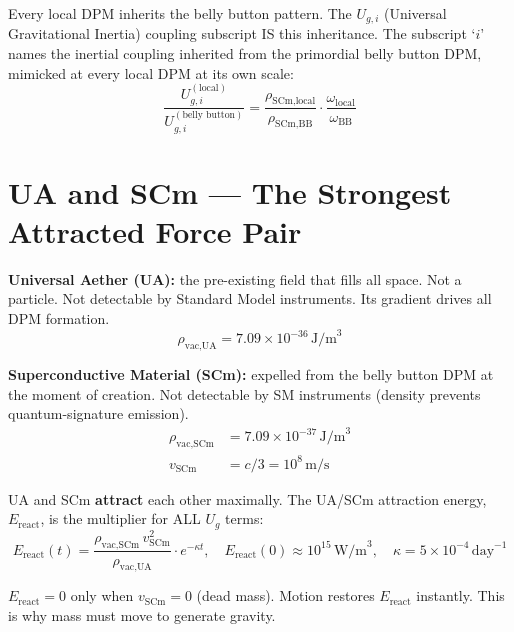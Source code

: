 \documentclass[12pt,a4paper]{article}
\begin{document}
Every local DPM inherits the belly button pattern.  The $U_{g,i}$
(Universal Gravitational Inertia) coupling subscript IS this inheritance.
The subscript `$i$' names the inertial coupling inherited from the primordial belly
button DPM, mimicked at every local DPM at its own scale:
\begin{equation}
  \frac{U_{g,i}^{(\text{local})}}{U_{g,i}^{(\text{belly button})}}
  = \frac{\rho_{\text{SCm,local}}}{\rho_{\text{SCm,BB}}}
    \cdot \frac{\omega_{\text{local}}}{\omega_\text{BB}}
  \label{eq:ug_scaling}
\end{equation}

\section{UA and SCm --- The Strongest Attracted Force Pair}
\label{sec:ua_scm}

\noindent\textbf{Universal Aether (UA):} the pre-existing field that fills all space.
Not a particle.  Not detectable by Standard Model instruments.  Its gradient drives
all DPM formation.
\begin{equation}
  \rho_{\text{vac,UA}} = 7.09\times10^{-36}\,\text{J/m}^3
  \label{eq:rho_ua}
\end{equation}

\noindent\textbf{Superconductive Material (SCm):} expelled from the belly button
DPM at the moment of creation.  Not detectable by SM instruments (density prevents
quantum-signature emission).
\begin{align}
  \rho_{\text{vac,SCm}} &= 7.09\times10^{-37}\,\text{J/m}^3 \label{eq:rho_scm}\\
  v_{\text{SCm}} &= c/3 = 10^8\,\text{m/s} \label{eq:v_scm}
\end{align}

\noindent UA and SCm \textbf{attract} each other maximally.  The UA/SCm attraction
energy, $E_{\text{react}}$, is the multiplier for ALL $U_g$ terms:
\begin{equation}
  E_{\text{react}}(t) = \frac{\rho_{\text{vac,SCm}}\,v_{\text{SCm}}^2}{\rho_{\text{vac,UA}}}
    \cdot e^{-\kappa t}, \quad
  E_{\text{react}}(0) \approx 10^{15}\,\text{W/m}^3, \quad
  \kappa = 5\times10^{-4}\,\text{day}^{-1}
  \label{eq:e_react}
\end{equation}

$E_{\text{react}} = 0$ only when $v_{\text{SCm}} = 0$ (dead mass).  Motion restores
$E_{\text{react}}$ instantly.  This is why mass must move to generate gravity.
\end{document}
